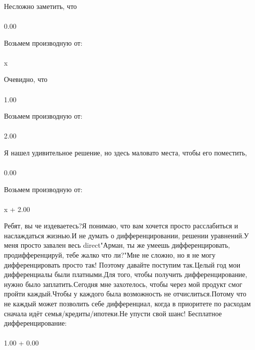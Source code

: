 Несложно заметить, что
\begin{gather}
\end{gather}
\begin{}
0.00 \\
\end{}
Возьмем производную от:
\begin{gather}
\end{gather}
\begin{}
x \\
\end{}
Очевидно, что
\begin{gather}
\end{gather}
\begin{}
1.00 \\
\end{}
Возьмем производную от:
\begin{gather}
\end{gather}
\begin{}
2.00 \\
\end{}
Я нашел удивительное решение, но здесь маловато места, чтобы его поместить, 
\begin{gather}
\end{gather}
\begin{}
0.00 \\
\end{}
Возьмем производную от:
\begin{gather}
\end{gather}
\begin{}
x + 2.00 \\
\end{}
Ребят, вы че издеваетесь?Я понимаю, что вам хочется просто расслабиться и наслаждаться жизнью.И не думать о дифференцировании, решении уравнений.У меня просто завален весь direct"Арман, ты же умеешь дифференцировать, продифференцируй, тебе жалко что ли?"Мне не сложно, но я не могу дифференцировать просто так! Поэтому давайте поступим так.Целый год мои дифференциалы были платными.Для того, чтобы получить дифференцирование, нужно было заплатить.Сегодня мне захотелось, чтобы через мой продукт смог пройти каждый.Чтобы у каждого была возможность не отчислиться.Потому что не каждый может позволить себе дифференциал, когда в приоритете по расходам сначала идёт семья/кредиты/ипотеки.Не упусти свой шанс! Бесплатное дифференцирование: 
\begin{gather}
\end{gather}
\begin{}
1.00 + 0.00 \\
\end{}

